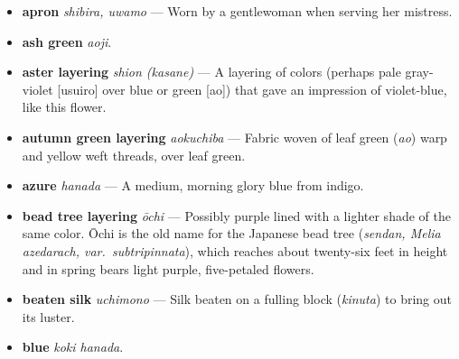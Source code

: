 \documentclass{article}
\begin{document}
\setlength{\columnsep}{5em}
\begin{multicols*}{2}
	\begin{itemize}[
			label=,
			leftmargin=0em,
			rightmargin=-1.5em,
			itemindent=-2em,
			nosep,
		]
		\setlength{\itemsep}{0.25em}


		\item \textbf{apron} \textit{shibira, uwamo} --- Worn by a gentlewoman when serving her mistress.

		\item \textbf{ash green} \textit{aoji}.

		\item \textbf{aster layering} \textit{shion (\textit{kasane})} --- A layering of colors (perhaps pale gray-violet [usuiro] over blue or green [ao]) that gave an impression of violet-blue, like this flower.

		\item \textbf{autumn green layering} \textit{aokuchiba} --- Fabric woven of leaf green (\textit{ao}) warp and yellow weft threads, over leaf green.

		\item \textbf{azure} \textit{hanada} --- A medium, morning glory blue from indigo.

		\item \textbf{bead tree layering} \textit{ōchi} --- Possibly purple lined with a lighter shade of the same color.
		      Ōchi is the old name for the Japanese bead tree
		      (\textit{sendan, Melia azedarach, var.\ subtripinnata}),
		      which reaches about twenty-six feet in height and in spring bears light purple, five-petaled flowers.

		\item \textbf{beaten silk} \textit{uchimono} --- Silk beaten on a fulling block (\textit{kinuta}) to bring out its luster.

		\item \textbf{blue} \textit{koki hanada}.


\end{itemize}
\end{multicols*}
\end{document}
